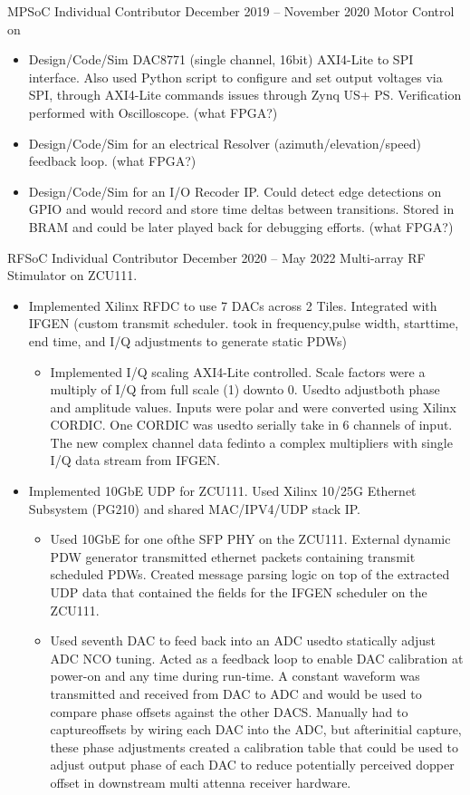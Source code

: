 \documentclass[10pt,final,sans]{resume}
\begin{document}
 { MPSoC Individual Contributor } { December 2019 -- November 2020 }
Motor Control on
\begin{itemize}
  \item Design/Code/Sim DAC8771 (single channel, 16bit) AXI4-Lite to SPI interface. Also used Python script to configure and set output voltages via SPI, through AXI4-Lite commands issues through Zynq US+ PS. Verification performed with Oscilloscope. (what FPGA?)
  \item Design/Code/Sim for an electrical Resolver (azimuth/elevation/speed) feedback loop. (what FPGA?)
  \item Design/Code/Sim for an I/O Recoder IP. Could detect edge detections on GPIO and would record and store time deltas between transitions. Stored in BRAM and could be later played back for debugging efforts. (what FPGA?)
\end{itemize}

 { RFSoC Individual Contributor } { December 2020 -- May 2022 }
Multi-array RF Stimulator on ZCU111.
\begin{itemize}
\item Implemented Xilinx RFDC to use 7 DACs across 2 Tiles. Integrated with IFGEN (custom transmit scheduler. took in frequency,pulse width, starttime, end time, and I/Q adjustments to generate static PDWs)
  \begin{itemize}
    \item Implemented I/Q scaling AXI4-Lite controlled. Scale factors were a multiply of I/Q from full scale (1) downto 0. Usedto adjustboth phase and amplitude values. Inputs were polar and were converted using Xilinx CORDIC. One CORDIC was usedto serially take in 6 channels of input. The new complex channel data fedinto a complex multipliers with single I/Q data stream from IFGEN.
  \end{itemize}
  \item Implemented 10GbE UDP for ZCU111. Used Xilinx 10/25G Ethernet Subsystem (PG210) and shared MAC/IPV4/UDP stack IP.
  \begin{itemize}
    \item Used 10GbE for one ofthe SFP PHY on the ZCU111. External dynamic PDW generator transmitted ethernet packets containing transmit scheduled PDWs. Created message parsing logic on top of the extracted UDP data that contained the fields for the IFGEN scheduler on the ZCU111.
    \item Used seventh DAC to feed back into an ADC usedto statically adjust ADC NCO tuning. Acted as a feedback loop to enable DAC calibration at power-on and any time during run-time. A constant waveform was transmitted and received from DAC to ADC and would be used to compare phase offsets against the other DACS. Manually had to captureoffsets by wiring each DAC into the ADC, but afterinitial capture, these phase adjustments created a calibration table that could be used to adjust output phase of each DAC to reduce potentially perceived dopper offset in downstream multi attenna receiver hardware.
  \end{itemize}
\end{itemize}
\end{document}
